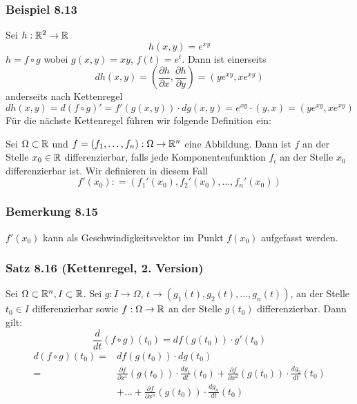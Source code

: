 \subsubsection*{Beispiel 8.13}
Sei $h:\mathbb{R}^2\to\mathbb{R}$ \[h(x,y)=e^{xy}\] $h= f\circ g$ wobei $g(x,y)=xy$, $f(t)=e^t$. Dann ist einerseits \[dh\left( {x,y} \right) = \left( {\frac{{\partial h}}{{\partial x}},\frac{{\partial h}}{{\partial y}}} \right) = \left( {y{e^{xy}},x{e^{xy}}} \right)\] anderseits nach Kettenregel
\[dh\left( {x,y} \right) = d\left( {f \circ g} \right)' = f'\left( {g\left( {x,y} \right)} \right) \cdot dg\left( {x,y} \right) = {e^{xy}} \cdot \left( {y,x} \right) = \left( {y{e^{xy}},x{e^{xy}}} \right)\]
Für die nächste Kettenregel führen wir folgende Definition ein:

\begin{definition}{8.14}
Sei $\Omega \subset\mathbb{R}$ und $f=\left( f_1,\dots,f_n\right):\Omega\to\mathbb{R}^n$ eine Abbildung. Dann ist $f$ an der Stelle $x_0\in\mathbb{R}$ differenzierbar, falls jede Komponentenfunktion $f_i$ an der Stelle $x_0$ differenzierbar ist. Wir definieren in diesem Fall \[f'\left( {{x_0}} \right): = \left( {{f_1}'\left( {{x_0}} \right),{f_2}'\left( {{x_0}} \right), \ldots ,{f_n}'\left( {{x_0}} \right)} \right)\]
\end{definition}

\subsubsection*{Bemerkung 8.15}
$f'\left( x_0\right)$ kann als Geschwindigkeitsvektor im Punkt $f\left( x_0\right)$ aufgefasst werden.

\subsubsection*{Satz 8.16 (Kettenregel, 2. Version)}
Sei $\Omega\subset\mathbb{R}^n,I\subset\mathbb{R}$. Sei $g:I\to\Omega$, $t\to\left( g_1(t), g_2(t),\dots, g_n(t)\right)$, an der Stelle $t_0\in I$ differenzierbar sowie $f:\Omega\to\mathbb{R}$ an der Stelle $g\left( t_0\right)$ differenzierbar. Dann gilt:
\[\frac{d}{{dt}}\left( {f \circ g} \right)\left( {{t_0}} \right) = df\left( {g\left( {{t_0}} \right)} \right) \cdot g'\left( {{t_0}} \right)\]
\begin{align*}
d\left( {f \circ g} \right)\left( {{t_0}} \right) =& df\left( {g\left( {{t_0}} \right)} \right) \cdot dg\left( {{t_0}} \right)\\
 =& \frac{{\partial f}}{{\partial {x^1}}}\left( {g\left( {{t_0}} \right)} \right) \cdot \frac{{d{g_1}}}{{dt}}\left( {{t_0}} \right) + \frac{{\partial f}}{{\partial {x^2}}}\left( {g\left( {{t_0}} \right)} \right) \cdot \frac{{d{g_2}}}{{dt}}\left( {{t_0}} \right)\\ & + \ldots  + \frac{{\partial f}}{{\partial {x^n}}}\left( {g\left( {{t_0}} \right)} \right) \cdot \frac{{d{g_n}}}{{dt}}\left( {{t_0}} \right)
\end{align*}


